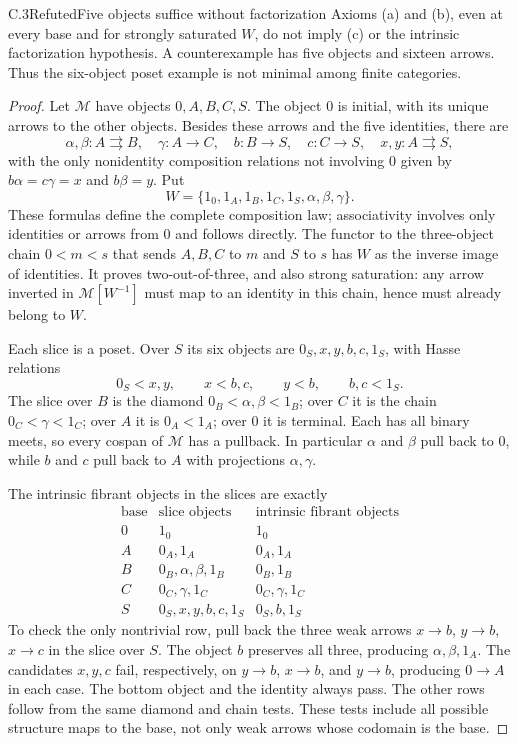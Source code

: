 \begin{claim}{C.3}{Refuted}{Five objects suffice without factorization}
Axioms (a) and (b), even at every base and for strongly saturated $W$,
do not imply (c) or the intrinsic factorization hypothesis. A
counterexample has five objects and sixteen arrows. Thus the
six-object poset example is not minimal among finite categories.
\end{claim}
\begin{proof}
Let $\mathcal M$ have objects $0,A,B,C,S$. The object $0$ is initial,
with its unique arrows to the other objects. Besides these arrows
and the five identities, there are
\[
 \alpha,\beta:A\rightrightarrows B,\quad \gamma:A\to C,
 \quad b:B\to S,\quad c:C\to S,\quad x,y:A\rightrightarrows S,
\]
with the only nonidentity composition relations not involving $0$
given by $b\alpha=c\gamma=x$ and $b\beta=y$. Put
\[
 W=\{1_0,1_A,1_B,1_C,1_S,\alpha,\beta,\gamma\}.
\]
These formulas define the complete composition law; associativity
involves only identities or arrows from $0$ and follows directly.
The functor to the three-object chain $0<m<s$ that sends $A,B,C$
to $m$ and $S$ to $s$ has $W$ as the inverse image of identities.
It proves two-out-of-three, and also strong saturation: any arrow
inverted in $\mathcal M[W^{-1}]$ must map to an identity in this
chain, hence must already belong to $W$.

Each slice is a poset. Over $S$ its six objects are
$0_S,x,y,b,c,1_S$, with Hasse relations
\[
 0_S<x,y,\qquad x<b,c,\qquad y<b,\qquad b,c<1_S.
\]
The slice over $B$ is the diamond $0_B<\alpha,\beta<1_B$;
over $C$ it is the chain $0_C<\gamma<1_C$; over $A$ it is
$0_A<1_A$; over $0$ it is terminal. Each has all binary meets,
so every cospan of $\mathcal M$ has a pullback. In particular
$\alpha$ and $\beta$ pull back to $0$, while $b$ and $c$ pull
back to $A$ with projections $\alpha,\gamma$.

The intrinsic fibrant objects in the slices are exactly
\[
\begin{array}{c|l|l}
\text{base}&\text{slice objects}&\text{intrinsic fibrant objects}\\\hline
0&1_0&1_0\\
A&0_A,1_A&0_A,1_A\\
B&0_B,\alpha,\beta,1_B&0_B,1_B\\
C&0_C,\gamma,1_C&0_C,\gamma,1_C\\
S&0_S,x,y,b,c,1_S&0_S,b,1_S
\end{array}
\]
To check the only nontrivial row, pull back the three weak arrows
$x\to b$, $y\to b$, $x\to c$ in the slice over $S$.
The object $b$ preserves all three, producing $\alpha,\beta,1_A$.
The candidates $x,y,c$ fail, respectively, on $y\to b$,
$x\to b$, and $y\to b$, producing $0\to A$ in each case.
The bottom object and the identity always pass. The other rows
follow from the same diamond and chain tests. These tests include
all possible structure maps to the base, not only weak arrows
whose codomain is the base.


\end{proof}
